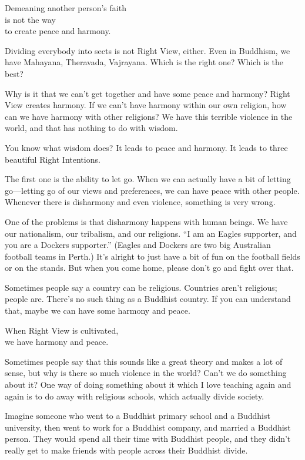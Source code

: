 \documentclass[12pt, openany]{book}
\newenvironment{aphorism}%
{%
\begin{center}\begin{itshape}
}%
{\end{itshape}\end{center}
}%
\begin{document}
\begin{aphorism}
Demeaning another person’s faith\\  
is not the way \\
to create peace and harmony.
\end{aphorism}

Dividing everybody into sects is not Right View, either. Even in Buddhism, we have Mahayana, Theravada, Vajrayana. Which is the right one? Which is the best? 

Why is it that we can’t get together and have some peace and harmony? Right View creates harmony. If we can’t have harmony within our own religion, how can we have harmony with other religions? We have this terrible violence in the world, and that has nothing to do with wisdom. 

You know what wisdom does? It leads to peace and harmony. It leads to three beautiful Right Intentions. 

The first one is the ability to let go. When we can actually have a bit of letting go—letting go of our views and preferences, we can have peace with other people. Whenever there is disharmony and even violence, something is very wrong. 

One of the problems is that disharmony happens with human beings. We have our nationalism, our tribalism, and our religions. “I am an Eagles supporter, and you are a Dockers supporter.” (Eagles and Dockers are two big Australian football teams in Perth.) It’s alright to just have a bit of fun on the football fields or on the stands. But when you come home, please don’t go and fight over that. 

Sometimes people say a country can be religious. Countries aren’t religious; people are. There’s no such thing as a Buddhist country. If you can understand that, maybe we can have some harmony and peace. 

\begin{aphorism}
When Right View is cultivated,\\  
we have harmony and peace.
\end{aphorism}

Sometimes people say that this sounds like a great theory and makes a lot of sense, but why is there so much violence in the world? Can’t we do something about it? One way of doing something about it which I love teaching again and again is to do away with religious schools, which actually divide society. 

Imagine someone who went to a Buddhist primary school and a Buddhist university, then went to work for a Buddhist company, and married a Buddhist person. They would spend all their time with Buddhist people, and they didn’t really get to make friends with people across their Buddhist divide. 
\end{document}
